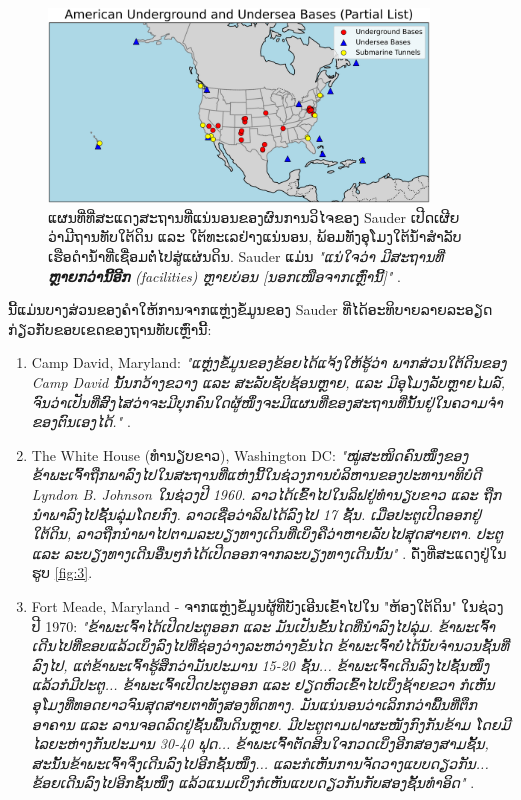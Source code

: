 \documentclass[10pt,twocolumn,letterpaper]{article}
\begin{document}
\begin{figure}[t]
\begin{center}
\includegraphics[width=0.9\textwidth]{basescrop.png}
\end{center}
   \caption{ແຜນທີ່ທີ່ສະແດງສະຖານທີ່ແນ່ນອນຂອງຜົນການວິໄຈຂອງ Sauder ເປີດເຜີຍ ວ່າມີຖານທັບໃຕ້ດິນ ແລະ ໃຕ້ທະເລຢ່າງແນ່ນອນ, ພ້ອມທັງອຸໂມງໃຕ້ນ້ຳສຳລັບເຮືອດຳນ້ຳທີ່ເຊື່ອມຕໍ່ໄປສູ່ແຜ່ນດິນ.
Sauder ແມ່ນ \textit{"ແນ່ໃຈວ່າ ມີສະຖານທີ່ \textbf{ຫຼາຍກວ່ານີ້ອີກ} (facilities) ຫຼາຍບ່ອນ [ນອກເໜືອຈາກເຫຼົ່ານີ້]"} \cite{22}.}
   \label{fig:4}
\end{figure}

ນີ້ແມ່ນບາງສ່ວນຂອງຄຳໃຫ້ການຈາກແຫຼ່ງຂໍ້ມູນຂອງ Sauder ທີ່ໄດ້ອະທິບາຍລາຍລະອຽດກ່ຽວກັບຂອບເຂດຂອງຖານທັບເຫຼົ່ານີ້:

\begin{flushleft}
\begin{enumerate}
    \item Camp David, Maryland: \textit{"ແຫຼ່ງຂໍ້ມູນຂອງຂ້ອຍໄດ້ແຈ້ງໃຫ້ຮູ້ວ່າ ພາກສ່ວນໃຕ້ດິນຂອງ Camp David ນັ້ນກວ້າງຂວາງ ແລະ ສະລັບຊັບຊ້ອນຫຼາຍ, ແລະ ມີອຸໂມງລັບຫຼາຍໄມລ໌, ຈົນວ່າເປັນທີ່ສົງໄສວ່າຈະມີບຸກຄົນໃດຜູ້ໜຶ່ງຈະມີແຜນທີ່ຂອງສະຖານທີ່ນັ້ນຢູ່ໃນຄວາມຈຳຂອງຕົນເອງໄດ້."} \cite{22}. 
    \item The White House (ທຳນຽບຂາວ), Washington DC: \textit{"ໝູ່ສະໜິດຄົນໜຶ່ງຂອງຂ້າພະເຈົ້າຖືກພາລົງໄປໃນສະຖານທີ່ແຫ່ງນີ້ໃນຊ່ວງການບໍລິຫານຂອງປະທານາທິບໍດີ Lyndon B. Johnson ໃນຊ່ວງປີ 1960. ລາວໄດ້ເຂົ້າໄປໃນລິຟຢູ່ທຳນຽບຂາວ ແລະ ຖືກນຳພາລົງໄປຊັ້ນລຸ່ມໂດຍກົງ. ລາວເຊື່ອວ່າລິຟໄດ້ລົງໄປ 17 ຊັ້ນ. ເມື່ອປະຕູເປີດອອກຢູ່ໃຕ້ດິນ, ລາວຖືກນຳພາໄປຕາມລະບຽງທາງເດິນທີ່ເບິ່ງຄືວ່າຫາຍລັບໄປສຸດສາຍຕາ. ປະຕູ ແລະ ລະບຽງທາງເດີນອື່ນໆກໍໄດ້ເປີດອອກຈາກລະບຽງທາງເດີນນັ້ນ"} \cite{22}. 
ດັ່ງທີ່ສະແດງຢູ່ໃນຮູບ \ref{fig:3}.
    \item Fort Meade, Maryland - ຈາກແຫຼ່ງຂໍ້ມູນຜູ້ທີ່ບັງເອີນເຂົ້າໄປໃນ "ຫ້ອງໃຕ້ດິນ" ໃນຊ່ວງປີ 1970: \textit{"ຂ້າພະເຈົ້າໄດ້ເປີດປະຕູອອກ ແລະ ມັນເປັນຂັ້ນໄດທີ່ນໍາລົງໄປລຸ່ມ. ຂ້າພະເຈົ້າເດີນໄປທີ່ຂອບແລ້ວເບິ່ງລົງໄປທີ່ຊ່ອງວ່າງລະຫວ່າງຂັນໄດ ຂ້າພະເຈົ້າບໍ່ໄດ້ນັບຈຳນວນຊັ້ນທີ່ລົງໄປ, ແຕ່ຂ້າພະເຈົ້າຮູ້ສຶກວ່າມັນປະມານ 15-20 ຊັ້ນ... ຂ້າພະເຈົ້າເດີນລົງໄປຊັ້ນໜຶ່ງ ແລ້ວກໍມີປະຕູ... ຂ້າພະເຈົ້າເປີດປະຕູອອກ ແລະ ຢຽດຫົວເຂົ້າໄປເບິ່ງຊ້າຍຂວາ ກໍເຫັນອຸໂມງທີ່ທອດຍາວຈົນສຸດສາຍຕາທັງສອງທິດທາງ. ມັນແນ່ນອນວ່າເລິກກວ່າພື້ນທີ່ຕຶກອາຄານ ແລະ ລານຈອດລົດຢູ່ຊັ້ນພື້ນດິນຫຼາຍ. ມີປະຕູຕາມຝາຜະໜັງກົງກັນຂ້າມ ໂດຍມີໄລຍະຫ່າງກັນປະມານ 30-40 ຟຸດ... ຂ້າພະເຈົ້າຕັດສິນໃຈກວດເບິ່ງອີກສອງສາມຊັ້ນ, ສະນັ້ນຂ້າພະເຈົ້າຈຶ່ງເດີນລົງໄປອີກຊັ້ນໜຶ່ງ... ແລະກໍເຫັນການຈັດວາງແບບດຽວກັນ... ຂ້ອຍເດີນລົງໄປອີກຊັ້ນໜຶ່ງ ແລ້ວແນມເບິ່ງກໍເຫັນແບບດຽວກັນກັບສອງຊັ້ນທຳອິດ"} \cite{22}.
\end{enumerate}
\end{flushleft}
\end{document}
